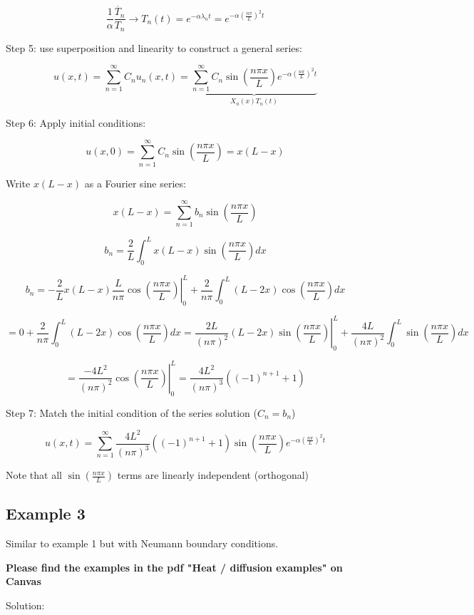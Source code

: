 $$\frac{1}{\alpha} \frac{\dot{T_n}}{T_n} \rightarrow T_n(t) = e^{- \alpha \lambda_n t} = e^{- \alpha \left( \frac{n \pi}{L} \right)^2 t}$$

Step 5: use superposition and linearity to construct a general series:

$$u(x,t) = \sum_{n  =1}^\infty C_n u_n (x,t) = \underbrace{\sum_{n = 1}^\infty C_n \sin \left( \frac{n \pi x}{L} \right) e^{- \alpha \left( \frac{n \pi}{L} \right)^2 t}}_{X_n(x) T_n(t)}$$

Step 6: Apply initial conditions:

$$u(x,0) = \sum_{n = 1}^\infty C_n \sin (\frac{n \pi x}{L} ) = x(L-x)$$


Write $x(L-x)$ as a Fourier sine series: 

$$x(L-x) = \sum_{n = 1}^\infty b_n \sin (\frac{n \pi x}{L} )$$

$$b_n = \frac{2}{L} \int_0^L x(L-x) \sin \left( \frac{n \pi x}{L} \right) dx$$

$$b_n = \left. - \frac{2}{L} x(L-x) \frac{L}{n \pi} \cos(\frac{n \pi x}{L}) \right|_{0}^{L} + \frac{2}{n \pi} \int_{0}^L (L - 2x) \cos(\frac{n \pi x}{L}) dx$$

$$ = 0 + \frac{2}{n \pi} \int_0^L (L - 2x) \cos \left(\frac{n \pi x}{L} \right) dx = \left. \frac{2L}{(n \pi)^2} (L - 2x) \sin \left(\frac{n \pi x}{L} \right) \right|_{0}^L + \frac{4L}{(n \pi)^2} \int_0^L \sin \left(\frac{n \pi x}{L} \right) dx$$

$$ = \left. \frac{- 4 L^2}{(n \pi)^2} \cos \left(\frac{n \pi x}{L} \right) \right|_0^L = \frac{4L^2}{(n \pi)^3} \left( (-1)^{n+1} + 1 \right)$$

Step 7: Match the initial condition of the series solution ($C_n = b_n$)

$$u(x,t) = \sum_{n = 1}^\infty \frac{4 L^2}{(n \pi)^3} \left( (-1)^{n+1} + 1 \right) \sin \left( \frac{n \pi x}{L} \right) e^{- \alpha \left( \frac{n \pi}{L} \right)^2 t}$$

Note that all $\sin(\frac{n \pi x}{L})$ terms are linearly independent (orthogonal)

\subsection{Example 3}

Similar to example 1 but with Neumann boundary conditions.

\textbf{Please find the examples in the pdf "Heat / diffusion examples" on Canvas}

\begin{center}
    Solution:
\end{center}

